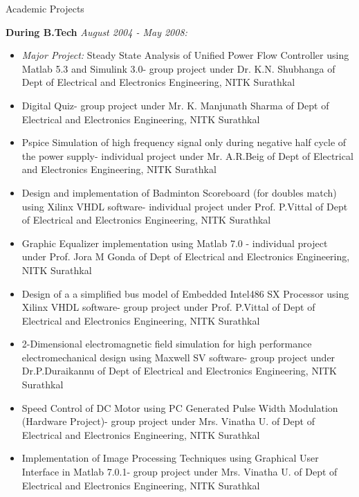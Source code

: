 \documentclass[10pt]{article}
\begin{document}
\begin{cv}
\begin{cvlist}{Academic Projects}
\item \textbf{ During B.Tech} \textit{August 2004 - May 2008:}
\begin{itemize}\itemsep=0.25em
	\item \textit{Major Project:} Steady State Analysis of Unified Power Flow Controller using Matlab 5.3 and
Simulink 3.0- group project under Dr. K.N. Shubhanga of Dept of Electrical and
Electronics Engineering, NITK Surathkal

\item
Digital Quiz- group project under Mr. K. Manjunath
Sharma of Dept of Electrical and Electronics
Engineering, NITK Surathkal
\item

Pspice Simulation of high frequency signal only during
negative half cycle of the power supply- individual
project under Mr. A.R.Beig of Dept of Electrical and
Electronics Engineering, NITK Surathkal

\item
Design and implementation of Badminton Scoreboard (for
doubles match) using Xilinx VHDL software- individual project
under Prof. P.Vittal of Dept of Electrical and
Electronics Engineering, NITK Surathkal

\item
Graphic Equalizer implementation using Matlab 7.0
- individual project under Prof. Jora M Gonda of Dept of
Electrical and Electronics Engineering, NITK Surathkal

\item
Design of a a simplified bus model of Embedded
Intel486 SX Processor using Xilinx VHDL software- group
project under Prof. P.Vittal of Dept of Electrical
and Electronics Engineering, NITK Surathkal

\item
2-Dimensional electromagnetic field simulation for
high performance electromechanical design using Maxwell
SV software- group project under Dr.P.Duraikannu
of Dept of Electrical and Electronics Engineering,
NITK Surathkal

\item
Speed Control of DC Motor using PC Generated Pulse Width
Modulation (Hardware Project)- group project under Mrs. Vinatha U. of
Dept of Electrical and Electronics Engineering, NITK
Surathkal

\item
Implementation of Image Processing Techniques using Graphical User
Interface in Matlab 7.0.1- group project under Mrs. Vinatha U. of Dept of Electrical
and Electronics Engineering, NITK Surathkal






\end{itemize}
\end{cvlist}
\end{cv}
\end{document}
